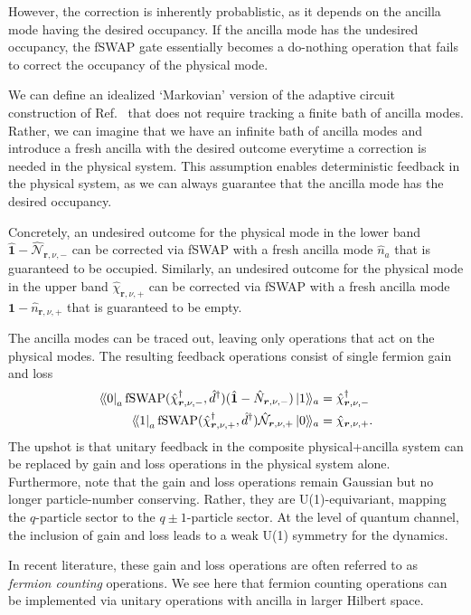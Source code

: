 \documentclass[aps,prb,twocolumn,superscriptaddress,longbibliography,floatfix]{revtex4-2}
\newcommand{\mc}[1]{\mathcal{#1}}
\newcommand{\Id}{\mathbf{1}}
\newcommand{\bfr}{\boldsymbol r}
\newcommand{\kett}[1]{\ket{#1}\!\rangle}
\newcommand{\braa}[1]{\langle\!\bra{#1}}
\newcommand{\fSWAP}{\operatorname{fSWAP}}
\theoremstyle{plain}
\theoremstyle{definition}
\theoremstyle{remark}
\begin{document}
However, the correction is inherently probablistic, as it depends on the ancilla mode having the desired occupancy. If the ancilla mode has the undesired occupancy, the fSWAP gate essentially becomes a do-nothing operation that fails to correct the occupancy of the physical mode. 

We can define an idealized `Markovian' version of the adaptive circuit construction of Ref.~\cite{BhuiyanPanJian2026} that does not require tracking a finite bath of ancilla modes. Rather, we can imagine that we have an infinite bath of ancilla modes and introduce a fresh ancilla with the desired outcome everytime a correction is needed in the physical system. This assumption enables deterministic feedback in the physical system, as we can always guarantee that the ancilla mode has the desired occupancy.

Concretely, an undesired outcome for the physical mode in the lower band $\hat{\Id}-\hat{\mathcal{N}}_{\bfr,\nu,-}$ can be corrected via fSWAP with a fresh ancilla mode $\hat{n}_{a}$ that is guaranteed to be occupied. Similarly, an undesired outcome for the physical mode in the upper band $\hat{\chi}_{\bfr,\nu,+}$ can be corrected via fSWAP with a fresh ancilla mode $\Id-\hat{n}_{\bfr,\nu,+}$ that is guaranteed to be empty. 

The ancilla modes can be traced out, leaving only operations that act on the physical modes. The resulting feedback operations consist of single fermion gain and loss
\begin{align}
    \braa{0}_a\fSWAP(\hat{\chi}_{\bfr,\nu,-}^\dagger,\hat{d}^\dagger)(\hat{\Id}-\hat{N}_{\bfr,\nu,-})\kett{1}_a &= \hat{\chi}_{\bfr,\nu,-}^\dagger\\
    \braa{1}_a\fSWAP(\hat{\chi}_{\bfr,\nu,+}^\dagger,\hat{d}^\dagger)\hat{\mc{N}}_{\bfr,\nu,+}\kett{0}_a &= \hat{\chi}_{\bfr,\nu,+}.
\end{align}
The upshot is that unitary feedback in the composite physical+ancilla system can be replaced by gain and loss operations in the physical system alone. Furthermore, note that the gain and loss operations remain Gaussian but no longer particle-number conserving. Rather, they are U(1)-equivariant, mapping the $q$-particle sector to the $q\pm1$-particle sector. At the level of quantum channel, the inclusion of gain and loss leads to a weak U(1) symmetry for the dynamics.

In recent literature, these gain and loss operations are often referred to as \emph{fermion counting} operations. We see here that fermion counting operations can be implemented via unitary operations with ancilla in larger Hilbert space.
\end{document}
